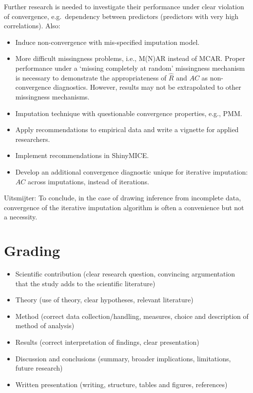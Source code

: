 \documentclass[Royal,times,sageh]{sagej}
\begin{document}
Further research is needed to investigate their performance under clear
violation of convergence, e.g.~dependency between predictors (predictors
with very high correlations). Also:

\begin{itemize}
\item
  Induce non-convergence with mis-specified imputation model.
\item
  More difficult missingness problems, i.e., M(N)AR instead of MCAR.
  Proper performance under a `missing completely at random' missingness
  mechanism is necessary to demonstrate the appropriateness of
  \(\widehat{R}\) and \(AC\) as non-convergence diagnostics. However,
  results may not be extrapolated to other missingness mechanisms.
\item
  Imputation technique with questionable convergence properties, e.g.,
  PMM.
\item
  Apply recommendations to empirical data and write a vignette for
  applied researchers.
\item
  Implement recommendations in ShinyMICE.
\item
  Develop an additional convergence diagnostic unique for iterative
  imputation: \(AC\) across imputations, instead of iterations.
\end{itemize}

Uitsmijter: To conclude, in the case of drawing inference from
incomplete data, convergence of the iterative imputation algorithm is
often a convenience but not a necessity.

\hypertarget{grading}{%
\section{Grading}\label{grading}}

\begin{itemize}
\item
  Scientific contribution (clear research question, convincing
  argumentation that the study adds to the scientific literature)
\item
  Theory (use of theory, clear hypotheses, relevant literature)
\item
  Method (correct data collection/handling, measures, choice and
  description of method of analysis)
\item
  Results (correct interpretation of findings, clear presentation)
\item
  Discussion and conclusions (summary, broader implications,
  limitations, future research)
\item
  Written presentation (writing, structure, tables and figures,
  references)
\end{itemize}



\end{document}
